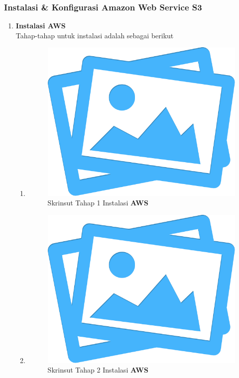 \subsubsection{Instalasi \& Konfigurasi \textbf{Amazon Web Service S3}}

	\begin{enumerate}[label={}]
		
		\item \textbf{Instalasi \textbf{AWS}} 
			\\Tahap-tahap untuk instalasi adalah sebagai berikut
			\begin{enumerate}[label=\roman*]				\item \mylipsum
					\begin{figure}[H]
						\centering
						\includegraphics[width=0.4\textheight]{images/no-image.png}
						\caption{Skrinsut Tahap 1 Instalasi \textbf{AWS}}
						\label{pdm-final}
					\end{figure}				\item \mylipsum
					\begin{figure}[H]
						\centering
						\includegraphics[width=0.4\textheight]{images/no-image.png}
						\caption{Skrinsut Tahap 2 Instalasi \textbf{AWS}}
						\label{pdm-final}
					\end{figure}		
						

\end{enumerate}
\end{enumerate}
